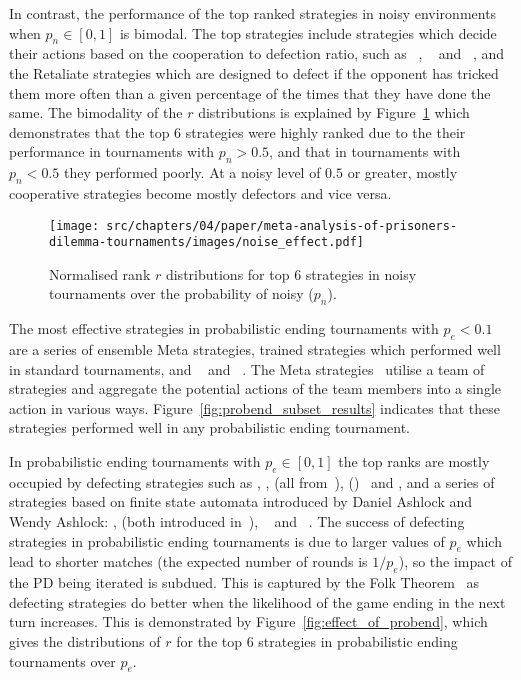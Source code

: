 In contrast, the performance of the top ranked strategies in noisy environments
when \(p_n\in [0, 1]\) is bimodal. The top strategies include strategies which
decide their actions based on the cooperation to defection ratio, such as
\ShortMem~\cite{Andre2013}, \Grumpy~\cite{axelrodproject} and
\e~\cite{axelrodproject}, and the Retaliate strategies which are designed to
defect if the opponent has tricked them more often than a given percentage of the times that
they have done the same. The bimodality of the \(r\) distributions is explained
by Figure~\ref{fig:effect_of_noise} which demonstrates that the top 6 strategies
were highly ranked due to the their performance in tournaments with \(p_n>0.5\),
and that in tournaments with \(p_n<0.5\) they
performed poorly. At a noisy level of \(0.5\) or greater, mostly cooperative strategies
become mostly defectors and vice versa.

\begin{figure}[!htbp]
    \centering
    \texttt{[image: src/chapters/04/paper/meta-analysis-of-prisoners-dilemma-tournaments/images/noise\_effect.pdf]}
    \caption{Normalised rank \(r\) distributions for top 6 strategies in noisy tournaments over
    the probability of noisy ($p_n$).}
    \label{fig:effect_of_noise}
\end{figure}

The most effective strategies in probabilistic ending
tournaments with \(p_e< 0.1\) are a series of ensemble Meta strategies, trained strategies
which performed well
in standard tournaments, and \Grudger~\cite{axelrodproject} and \SpitefulTitForTat~\cite{prison}.
The Meta strategies~\cite{axelrodproject} utilise a team of
strategies and aggregate the potential actions of the team members into a single action
in various ways. Figure~\ref{fig:probend_subset_results} indicates that these strategies
performed well in any probabilistic ending tournament.

In probabilistic ending tournaments with \(p_e \in [0, 1]\) the top ranks are
mostly occupied by defecting strategies such as \BetterandBetter, \GradualKiller,
\HardProber (all from~\cite{axelrodproject}), \Bully (\ReverseTitForTat)~\cite{Nachbar1992}
and \Defector, and a series of strategies based on finite
state automata introduced by Daniel Ashlock and Wendy Ashlock: \FortressThree,
\FortressFour (both introduced in~\cite{Ashlock2006}), \Raider~\cite{Ashlock2014}
and \SolutionBOne~\cite{Ashlock2014}. The success of defecting strategies in
probabilistic ending tournaments is due to larger values of
\(p_e\) which lead to shorter matches (the expected number of rounds is \(1 / p_e\)), so the
impact of the PD being iterated is subdued. This is captured by the Folk
Theorem~\cite{Fudenberg2009} as defecting strategies do better when the likelihood
of the game ending in the next turn increases.
This is demonstrated by Figure~\ref{fig:effect_of_probend}, which gives the
distributions of \(r\) for the top 6 strategies in probabilistic ending tournaments
over \(p_e\).

